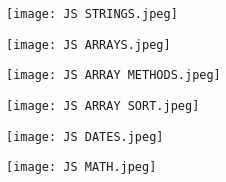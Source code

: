 \documentclass{article}
\begin{document}
\begin{itemize}
            \newline \newline \newline
            \newline \newline \newline
            \texttt{[image: JS STRINGS.jpeg]}

            \newline \newline \newline
            \newline \newline \newline
            \texttt{[image: JS ARRAYS.jpeg]}

            \newline \newline \newline
            \newline \newline \newline
            \texttt{[image: JS ARRAY METHODS.jpeg]}

            \newline \newline \newline
            \newline \newline \newline
            \texttt{[image: JS ARRAY SORT.jpeg]}

            \newline \newline \newline
            \newline \newline \newline
            \texttt{[image: JS DATES.jpeg]}

            \newline \newline \newline
            \newline \newline \newline
            \texttt{[image: JS MATH.jpeg]}


\end{itemize}
\end{document}
